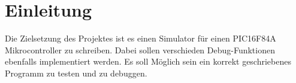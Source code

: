 \chapter{Einleitung}			%

Die Zielsetzung des Projektes ist es einen Simulator für einen PIC16F84A Mikrocontroller zu schreiben. Dabei sollen verschieden Debug-Funktionen ebenfalls implementiert werden. Es soll Möglich sein ein korrekt geschriebenes Programm zu testen und zu debuggen.

